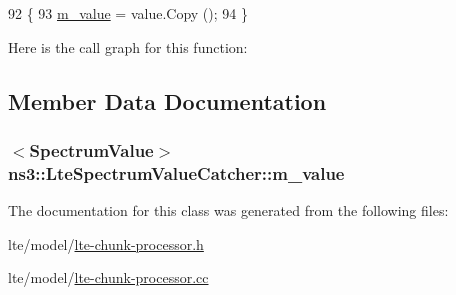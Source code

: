 \begin{DoxyCode}
92 \{
93   \hyperlink{classns3_1_1LteSpectrumValueCatcher_a3a509e2c3d7da4c244d24267f0a66dd3}{m\_value} = value.Copy ();
94 \}
\end{DoxyCode}


Here is the call graph for this function\+:




\subsection{Member Data Documentation}
\subsubsection[{\texorpdfstring{m\+\_\+value}{m_value}}]{$<${\bf Spectrum\+Value}$>$ ns3\+::\+Lte\+Spectrum\+Value\+Catcher\+::m\+\_\+value\hspace{0.3cm}{\ttfamily [private]}}\hypertarget{classns3_1_1LteSpectrumValueCatcher_a3a509e2c3d7da4c244d24267f0a66dd3}{}\label{classns3_1_1LteSpectrumValueCatcher_a3a509e2c3d7da4c244d24267f0a66dd3}


The documentation for this class was generated from the following files\+:\begin{DoxyCompactItemize}
\item 
lte/model/\hyperlink{lte-chunk-processor_8h}{lte-\/chunk-\/processor.\+h}\item 
lte/model/\hyperlink{lte-chunk-processor_8cc}{lte-\/chunk-\/processor.\+cc}\end{DoxyCompactItemize}
